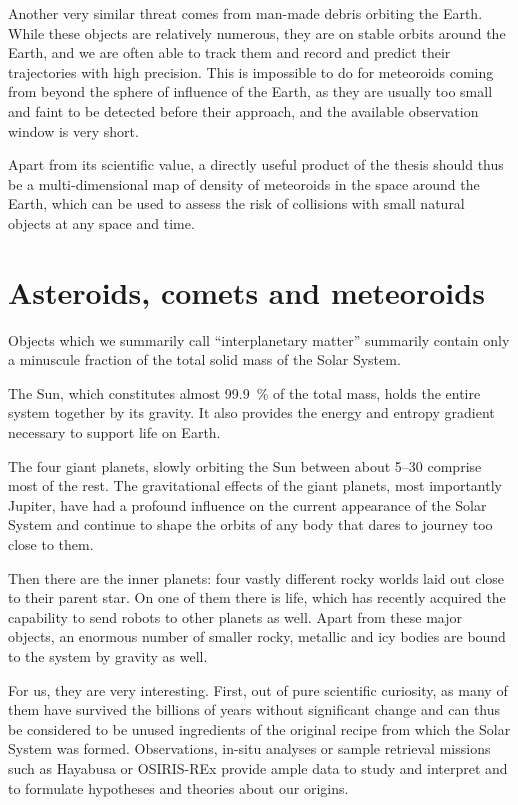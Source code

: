     Another very similar threat comes from man-made debris orbiting the Earth.
    While these objects are relatively numerous, they are on stable orbits around
    the Earth, and we are often able to track them and record and predict their trajectories with high precision.
    This is impossible to do for meteoroids coming from beyond the sphere of influence of the Earth,
    as they are usually too small and faint to be detected before their approach,
    and the available observation window is very short.

    Apart from its scientific value, a directly useful product of the thesis should thus
    be a multi-dimensional map of density of meteoroids in the space around the Earth,
    which can be used to assess the risk of collisions with small natural objects
    at any space and time.

\section{Asteroids, comets and meteoroids} \label{ia}
    Objects which we summarily call ``interplanetary matter'' summarily contain only a minuscule fraction of
    the total solid mass of the Solar System.


    The Sun, which constitutes almost \SI{99.9}{\percent} of the total mass, holds the entire
    system together by its gravity. It also provides the energy and entropy gradient necessary
    to support life on Earth.

    The four giant planets, slowly orbiting the Sun between about \SIrange[range-phrase = {\ and\ }]{5}{30}{\au}
    comprise most of the rest. The gravitational effects of the giant planets, most importantly Jupiter,
    have had a profound influence on the current appearance of the Solar System and continue to
    shape the orbits of any body that dares to journey too close to them.

    Then there are the inner planets: four vastly different rocky worlds laid out
    close to their parent star. On one of them there is life,
    which has recently acquired the capability to send robots to other planets as well.
    Apart from these major objects, an enormous number of smaller rocky, metallic and icy
    bodies are bound to the system by gravity as well.

    For us, they are very interesting. First, out of pure scientific curiosity, as many of them
    have survived the billions of years without significant change and can thus be considered
    to be unused ingredients of the original recipe from which the Solar System was formed.
    Observations, in-situ analyses or sample retrieval missions such as Hayabusa or OSIRIS-REx
    provide ample data to study and interpret and to formulate hypotheses and theories about our origins.

